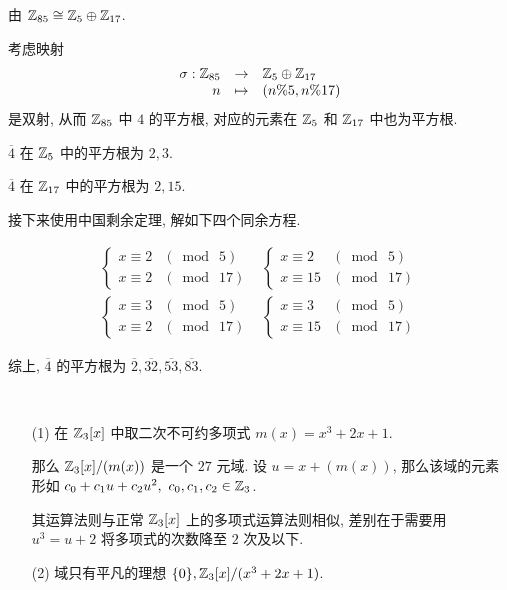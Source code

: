 \begin{solution}

由 $\mathbb Z_{85}\cong \mathbb Z_{5}\oplus\mathbb Z_{17}$.

考虑映射 $$\begin{array}{rcl}
	\sigma: \mathbb Z_{85}&\to&\mathbb Z_5\oplus\mathbb Z_{17}\\
	n&\mapsto&(n\%5,n\%17)
\end{array}$$
是双射, 从而 $\mathbb Z_{85}$ 中 $4$ 的平方根, 对应的元素在 $\mathbb Z_5$ 和 $\mathbb Z_{17}$ 中也为平方根.

$\overline{4}$ 在 $\mathbb Z_{5}$ 中的平方根为 $2,3$.

$\overline{4}$ 在 $\mathbb Z_{17}$ 中的平方根为 $2,15$.

接下来使用中国剩余定理, 解如下四个同余方程.

$$\begin{array}{lr}
	\left\{\begin{array}{ll}
		x\equiv 2 & (\bmod\ 5) \\
		x\equiv 2 & (\bmod\ 17)
	\end{array}\right.
	&
	\left\{\begin{array}{ll}
		x\equiv 2 & (\bmod\ 5) \\
		x\equiv 15 & (\bmod\ 17)
	\end{array}\right.
	\\[25pt]
	\left\{\begin{array}{ll}
		x\equiv 3 & (\bmod\ 5) \\
		x\equiv 2 & (\bmod\ 17)
	\end{array}\right.
	&
	\left\{\begin{array}{ll}
		x\equiv 3 & (\bmod\ 5) \\
		x\equiv 15 & (\bmod\ 17)
	\end{array}\right.
\end{array}$$

综上, $\overline{4}$ 的平方根为 $\overline{2},\overline{32},\overline{53},\overline{83}$.

\end{solution}

\problem[题目 5]

\begin{solution}\
	\begin{itemize}
		\item[(1)] 在 $\mathbb Z_3[x]$ 中取二次不可约多项式 $m(x)=x^3+2x+1$.

		那么 $\mathbb Z_3[x]/(m(x))$ 是一个 $27$ 元域. 设 $u=x+(m(x))$, 那么该域的元素形如 $c_0+c_1u+c_2u^2,\ c_0,c_1,c_2\in\mathbb Z_3$.

		其运算法则与正常 $\mathbb Z_3[x]$ 上的多项式运算法则相似, 差别在于需要用 $u^3=u+2$ 将多项式的次数降至 $2$ 次及以下.

		\item[(2)] 域只有平凡的理想 $\{0\},\mathbb Z_3[x]/(x^3+2x+1)$.
	\end{itemize}
\end{solution}


